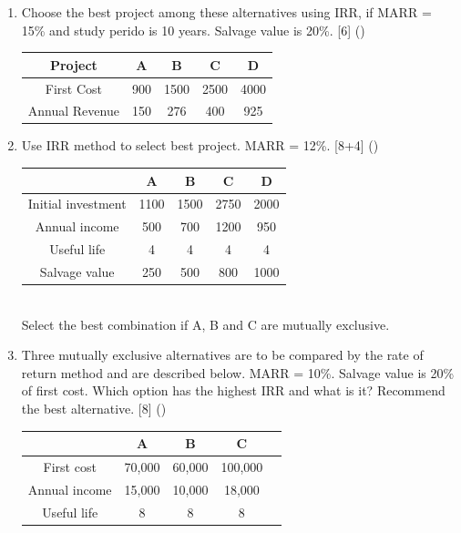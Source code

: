 \documentclass[12pt]{article}
\begin{document}
\begin{enumerate}
		\item Choose the best project among these alternatives using IRR, if MARR = 15\% and study perido is 10 years. Salvage value is 20\%. \hfill [6] ()\\
		\begin{tabular}{|c|c|c|c|c|}
			\hline
			Project & A & B & C & D \\ \hline
			First Cost & 900 & 1500 & 2500 & 4000 \\ \hline
			Annual Revenue & 150 & 276 & 400 & 925 \\ \hline
		\end{tabular}
		
		\item Use IRR method to select best project. MARR = 12\%. \hfill [8+4] ()
		\begin{tabular}{|c|c|c|c|c|}
			\hline
			& A & B & C & D \\ \hline
			Initial investment & 1100 & 1500 & 2750 & 2000 \\ \hline
			Annual income & 500 & 700 & 1200 & 950 \\ \hline
			Useful life & 4 & 4 & 4 & 4 \\ \hline
			Salvage value & 250 & 500 & 800 & 1000 \\ \hline
		\end{tabular}\\
		Select the best combination if A, B and C are mutually exclusive.
		
		\item Three mutually exclusive alternatives are to be compared by the rate of return method and are described below. MARR = 10\%. Salvage value is 20\% of first cost. Which option has the highest IRR and what is it? Recommend the best alternative. \hfill [8] ()\\
		\begin{tabular}{|c|c|c|c|c|}
			\hline
			& A & B & C \\ \hline
			First cost & 70,000 & 60,000 & 100,000 \\ \hline
			Annual income & 15,000 & 10,000 & 18,000 \\ \hline
			Useful life & 8 & 8 & 8 \\ \hline
		\end{tabular}
	\end{enumerate}
	
\end{document}
